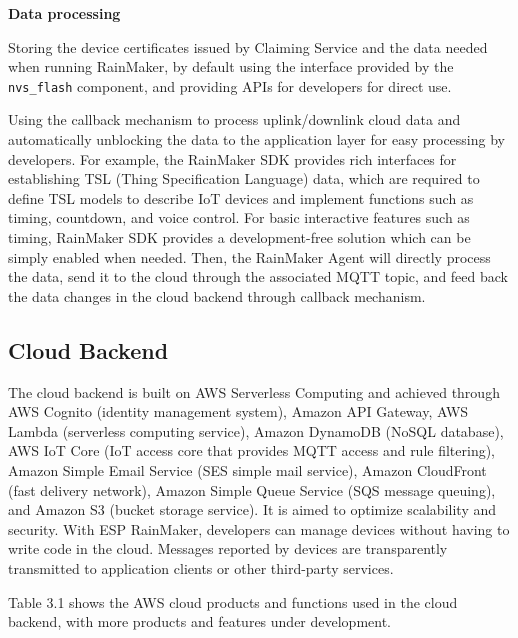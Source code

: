 \documentclass[a4paper,12pt,openany]{book}
\begin{document}
\textbf{Data processing}
\begin{enumerate}[label=\roman*.]
    {
    \item Storing the device certificates issued by Claiming Service and the data needed when running RainMaker, by default using the interface provided by the \texttt{nvs\_flash} component, and providing APIs for developers for direct use.
    \item Using the callback mechanism to process uplink/downlink cloud data and automatically unblocking the data to the application layer for easy processing by developers. For example, the RainMaker SDK provides rich interfaces for establishing TSL (Thing Specification Language) data, which are required to define TSL models to describe IoT devices and implement functions such as timing, countdown, and voice control. For basic interactive features such as timing, RainMaker SDK provides a development-free solution which can be simply enabled when needed. Then, the RainMaker Agent will directly process the data, send it to the cloud through the associated MQTT topic, and feed back the data changes in the cloud backend through callback mechanism.
    
    }
\end{enumerate}

\subsection{Cloud Backend}
The cloud backend is built on AWS Serverless Computing and achieved through AWS Cognito (identity management system), Amazon API Gateway, AWS Lambda (serverless computing service), Amazon DynamoDB (NoSQL database), AWS IoT Core (IoT access core that provides MQTT access and rule filtering), Amazon Simple Email Service (SES simple mail service), Amazon CloudFront (fast delivery network), Amazon Simple Queue Service (SQS message queuing), and Amazon S3 (bucket storage service). It is aimed to optimize scalability and security. With ESP RainMaker, developers can manage devices without having to write code in the cloud. Messages reported by devices are transparently transmitted to application clients or other third-party services.

Table 3.1 shows the AWS cloud products and functions used in the cloud backend, with more products and features under development.
\end{document}
